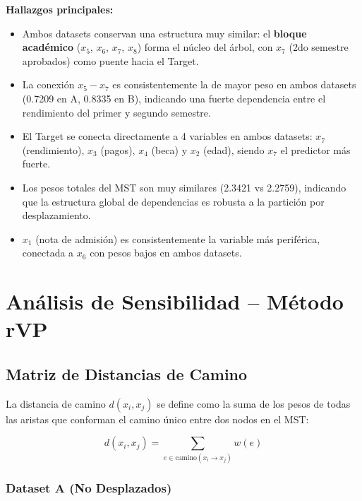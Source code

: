 \documentclass[12pt,a4paper]{article}
\begin{document}
\textbf{Hallazgos principales:}
\begin{itemize}
    \item Ambos datasets conservan una estructura muy similar: el \textbf{bloque académico} ($x_5$, $x_6$, $x_7$, $x_8$) forma el núcleo del árbol, con $x_7$ (2do semestre aprobados) como puente hacia el Target.
    \item La conexión $x_5 - x_7$ es consistentemente la de mayor peso en ambos datasets (0.7209 en A, 0.8335 en B), indicando una fuerte dependencia entre el rendimiento del primer y segundo semestre.
    \item El Target se conecta directamente a 4 variables en ambos datasets: $x_7$ (rendimiento), $x_3$ (pagos), $x_4$ (beca) y $x_2$ (edad), siendo $x_7$ el predictor más fuerte.
    \item Los pesos totales del MST son muy similares (2.3421 vs 2.2759), indicando que la estructura global de dependencias es robusta a la partición por desplazamiento.
    \item $x_1$ (nota de admisión) es consistentemente la variable más periférica, conectada a $x_6$ con pesos bajos en ambos datasets.
\end{itemize}

\newpage
\section{Análisis de Sensibilidad -- Método rVP}

\subsection{Matriz de Distancias de Camino}

La distancia de camino $d(x_i, x_j)$ se define como la suma de los pesos de todas las aristas que conforman el camino único entre dos nodos en el MST:

\begin{equation}
    d(x_i, x_j) = \sum_{e \in \text{camino}(x_i \rightarrow x_j)} w(e)
\end{equation}

\subsubsection{Dataset A (No Desplazados)}
\end{document}
